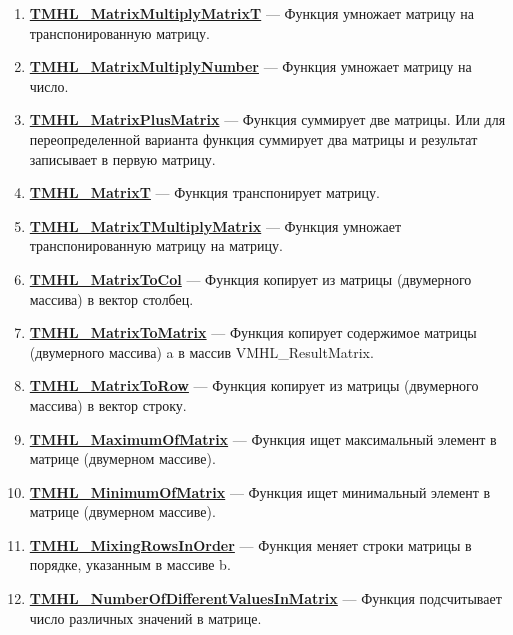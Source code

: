 \documentclass[a4paper,12pt]{article}
\begin{document}
\begin{enumerate}
\item \textbf{\hyperref[TMHL_MatrixMultiplyMatrixT]{TMHL\_MatrixMultiplyMatrixT}} --- Функция умножает матрицу на транспонированную матрицу.

\item \textbf{\hyperref[TMHL_MatrixMultiplyNumber]{TMHL\_MatrixMultiplyNumber}} --- Функция умножает матрицу на число.

\item \textbf{\hyperref[TMHL_MatrixPlusMatrix]{TMHL\_MatrixPlusMatrix}} --- Функция суммирует две матрицы. Или для переопределенной варианта функция суммирует два матрицы и результат записывает в первую матрицу. 

\item \textbf{\hyperref[TMHL_MatrixT]{TMHL\_MatrixT}} --- Функция транспонирует матрицу.

\item \textbf{\hyperref[TMHL_MatrixTMultiplyMatrix]{TMHL\_MatrixTMultiplyMatrix}} --- Функция умножает транспонированную матрицу на матрицу.

\item \textbf{\hyperref[TMHL_MatrixToCol]{TMHL\_MatrixToCol}} --- Функция копирует из матрицы (двумерного массива) в вектор столбец.

\item \textbf{\hyperref[TMHL_MatrixToMatrix]{TMHL\_MatrixToMatrix}} --- Функция копирует содержимое матрицы (двумерного массива) a в массив VMHL\_ResultMatrix.

\item \textbf{\hyperref[TMHL_MatrixToRow]{TMHL\_MatrixToRow}} --- Функция копирует из матрицы (двумерного массива) в вектор строку.

\item \textbf{\hyperref[TMHL_MaximumOfMatrix]{TMHL\_MaximumOfMatrix}} --- Функция ищет максимальный элемент в матрице (двумерном массиве).

\item \textbf{\hyperref[TMHL_MinimumOfMatrix]{TMHL\_MinimumOfMatrix}} --- Функция ищет минимальный элемент в матрице (двумерном массиве).

\item \textbf{\hyperref[TMHL_MixingRowsInOrder]{TMHL\_MixingRowsInOrder}} --- Функция меняет строки матрицы в порядке, указанным в массиве b.

\item \textbf{\hyperref[TMHL_NumberOfDifferentValuesInMatrix]{TMHL\_NumberOfDifferentValuesInMatrix}} --- Функция подсчитывает число различных значений в матрице.


\end{enumerate}
\end{document}
